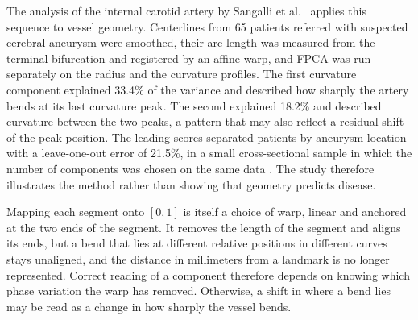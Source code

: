 The analysis of the internal carotid artery by Sangalli et al.\ \cite{sangalli2009aneurisk} applies this sequence to vessel geometry.
Centerlines from 65 patients referred with suspected cerebral aneurysm were smoothed, their arc length was measured from the terminal bifurcation and registered by an affine warp, and FPCA was run separately on the radius and the curvature profiles.
The first curvature component explained 33.4\% of the variance and described how sharply the artery bends at its last curvature peak.
The second explained 18.2\% and described curvature between the two peaks, a pattern that may also reflect a residual shift of the peak position.
The leading scores separated patients by aneurysm location with a leave-one-out error of 21.5\%, in a small cross-sectional sample in which the number of components was chosen on the same data \cite{sangalli2009aneurisk}.
The study therefore illustrates the method rather than showing that geometry predicts disease.

Mapping each segment onto $[0, 1]$ is itself a choice of warp, linear and anchored at the two ends of the segment.
It removes the length of the segment and aligns its ends, but a bend that lies at different relative positions in different curves stays unaligned, and the distance in millimeters from a landmark is no longer represented.
Correct reading of a component therefore depends on knowing which phase variation the warp has removed.
Otherwise, a shift in where a bend lies may be read as a change in how sharply the vessel bends.

